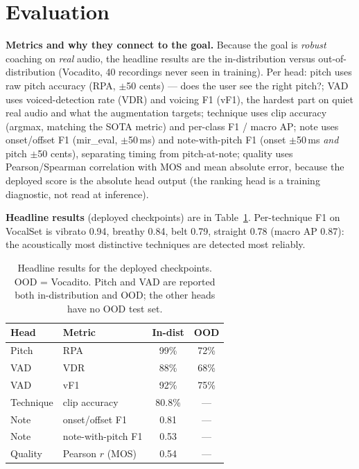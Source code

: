 \documentclass{article}
\begin{document}
\section{Evaluation}\label{sec:eval}

\textbf{Metrics and why they connect to the goal.} Because the goal is \emph{robust}
coaching on \emph{real} audio, the headline results are the in-distribution versus
out-of-distribution (Vocadito, 40 recordings never seen in training). Per head: pitch
uses raw pitch accuracy (RPA, $\pm$50 cents) --- does the user see the right pitch?;
VAD uses voiced-detection rate (VDR) and voicing F1 (vF1), the hardest part on quiet
real audio and what the augmentation targets; technique uses clip accuracy (argmax,
matching the SOTA metric) and per-class F1 / macro AP; note uses onset/offset F1
(mir\_eval, $\pm$50\,ms) and note-with-pitch F1 (onset $\pm$50\,ms \emph{and} pitch
$\pm$50 cents), separating timing from pitch-at-note; quality uses Pearson/Spearman
correlation with MOS and mean absolute error, because the deployed score is the
absolute head output (the ranking head is a training diagnostic, not read at
inference).

\textbf{Headline results} (deployed checkpoints) are in Table~\ref{tab:results}.
Per-technique F1 on VocalSet is vibrato 0.94, breathy 0.84, belt 0.79, straight 0.78
(macro AP 0.87): the acoustically most distinctive techniques are detected most
reliably.

\begin{table}[htbp]
\centering
\begin{tabular}{llcc}
\toprule
\bfseries Head & \bfseries Metric & \bfseries In-dist & \bfseries OOD \\
\midrule
Pitch     & RPA               & 99\%   & 72\% \\
VAD       & VDR               & 88\%   & 68\% \\
VAD       & vF1               & 92\%   & 75\% \\
Technique & clip accuracy     & 80.8\% & --- \\
Note      & onset/offset F1   & 0.81   & --- \\
Note      & note-with-pitch F1& 0.53   & --- \\
Quality   & Pearson $r$ (MOS) & 0.54   & --- \\
\bottomrule
\end{tabular}
\caption{Headline results for the deployed checkpoints. OOD = Vocadito. Pitch and VAD
are reported both in-distribution and OOD; the other heads have no OOD test set.}
\label{tab:results}
\end{table}
\end{document}
